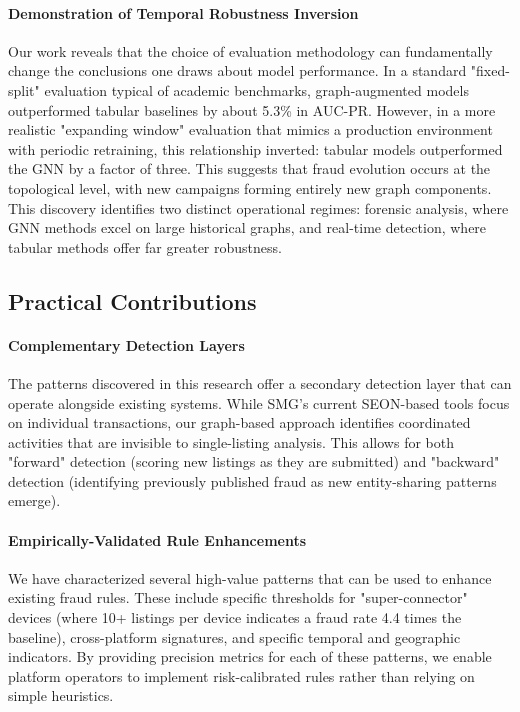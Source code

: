 \paragraph{Demonstration of Temporal Robustness Inversion}
Our work reveals that the choice of evaluation methodology can fundamentally change the conclusions one draws about model performance. In a standard "fixed-split" evaluation typical of academic benchmarks, graph-augmented models outperformed tabular baselines by about 5.3\% in AUC-PR. However, in a more realistic "expanding window" evaluation that mimics a production environment with periodic retraining, this relationship inverted: tabular models outperformed the GNN by a factor of three. This suggests that fraud evolution occurs at the topological level, with new campaigns forming entirely new graph components. This discovery identifies two distinct operational regimes: forensic analysis, where GNN methods excel on large historical graphs, and real-time detection, where tabular methods offer far greater robustness.

\subsection*{Practical Contributions}

\paragraph{Complementary Detection Layers}
The patterns discovered in this research offer a secondary detection layer that can operate alongside existing systems. While SMG's current SEON-based tools focus on individual transactions, our graph-based approach identifies coordinated activities that are invisible to single-listing analysis. This allows for both "forward" detection (scoring new listings as they are submitted) and "backward" detection (identifying previously published fraud as new entity-sharing patterns emerge).

\paragraph{Empirically-Validated Rule Enhancements}
We have characterized several high-value patterns that can be used to enhance existing fraud rules. These include specific thresholds for "super-connector" devices (where 10+ listings per device indicates a fraud rate 4.4 times the baseline), cross-platform signatures, and specific temporal and geographic indicators. By providing precision metrics for each of these patterns, we enable platform operators to implement risk-calibrated rules rather than relying on simple heuristics.

